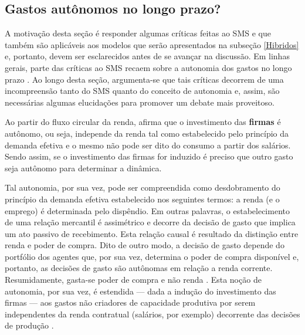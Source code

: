 \subsection{Gastos autônomos no longo prazo?}
\label{CrescimentoAutonomo}

A motivação desta seção é responder algumas críticas feitas ao SMS e que também são aplicáveis aos modelos que serão apresentados na subseção \ref{Hibridos} e, portanto, devem ser esclarecidos antes de se avançar na discussão.
Em linhas gerais, parte das críticas ao SMS recaem sobre a autonomia dos gastos no longo prazo \cites{skott_autonomous_2017}{nikiforos_comments_2018}. 
Ao longo desta seção, argumenta-se que tais críticas decorrem de uma incompreensão tanto do SMS quanto do conceito de autonomia e, assim, são necessárias algumas elucidações para promover um debate mais proveitoso.


Ao partir do fluxo circular da renda, \textcite{serrano_long_1995} afirma que o investimento das \textbf{firmas} é autônomo, ou seja, independe da renda tal como estabelecido pelo princípio da demanda efetiva e o mesmo não pode ser dito do consumo a partir dos salários. 
Sendo assim, se  o investimento das firmas for induzido é preciso que outro gasto seja autônomo para determinar a dinâmica.

Tal autonomia, por sua vez, pode ser compreendida como desdobramento do princípio da demanda efetiva estabelecido nos seguintes termos: a renda (e o emprego) é determinada pelo dispêndio. Em outras palavras, o estabelecimento de uma relação mercantil é assimétrico e decorre da decisão de gasto que implica um ato passivo de recebimento. 
Esta relação causal é resultado da distinção entre renda e poder de compra. Dito de outro modo, a decisão de gasto depende do portfólio dos agentes que, por sua vez, determina o poder de compra disponível e, portanto, as decisões de gasto são autônomas em relação a renda corrente.
Resumidamente, gasta-se poder de compra e não renda  \cites{possas_demanda_1981}[p.~47--72]{possas_dinamica_1987}[p.~1--9]{macedo_e_silva_macroeconomia_1999}.
Esta noção de autonomia, por sua vez, é estendida --- dada a indução do investimento das firmas --- aos gastos não criadores de capacidade produtiva por serem independentes da renda contratual (salários, por exemplo) decorrente das decisões de produção \cite{serrano_sraffian_1995}.




